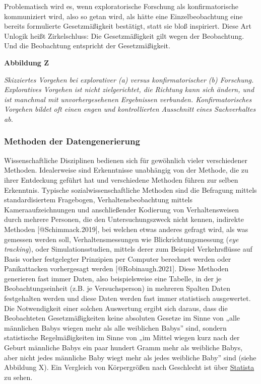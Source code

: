 \documentclass[
  letterpaper,
  DIV=11,
  numbers=noendperiod]{scrreprt}
\begin{document}
Problematisch wird es, wenn exploratorische Forschung als
konfirmatorische kommuniziert wird, also so getan wird, als hätte eine
Einzelbeobachtung eine bereits formulierte Gesetzmäßigkeit bestätigt,
statt sie bloß inspiriert. Diese Art Unlogik heißt Zirkelschluss: Die
Gesetzmäßigkeit gilt wegen der Beobachtung. Und die Beobachtung
entspricht der Gesetzmäßigkeit.

\textbf{Abbildung Z}

\emph{Skizziertes Vorgehen bei explorativer (a) versus konfirmatorischer
(b) Forschung. Exploratives Vorgehen ist nicht zielgerichtet, die
Richtung kann sich ändern, und ist manchmal mit unvorhergesehenen
Ergebnissen verbunden. Konfirmatorisches Vorgehen bildet oft einen engen
und kontrollierten Ausschnitt eines Sachverhaltes ab.}

\subsubsection{Methoden der
Datengenerierung}\label{methoden-der-datengenerierung}

Wissenschaftliche Disziplinen bedienen sich für gewöhnlich vieler
verschiedener Methoden. Idealerweise sind Erkenntnisse unabhängig von
der Methode, die zu ihrer Entdeckung geführt hat und verschiedene
Methoden führen zur selben Erkenntnis. Typische sozialwissenschaftliche
Methoden sind die Befragung mittels standardisiertem Fragebogen,
Verhaltensbeobachtung mittels Kameraaufzeichnungen und anschließender
Kodierung von Verhaltensweisen durch mehrere Personen, die den
Untersuchungszweck nicht kennen, indirekte Methoden
{[}@Schimmack.2019{]}, bei welchen etwas anderes gefragt wird, als was
gemessen werden soll, Verhaltensmessungen wie Blickrichtungsmessung
(\emph{eye tracking}), oder Simulationsstudien, mittels derer zum
Beispiel Verkehrsflüsse auf Basis vorher festgelegter Prinzipien per
Computer berechnet werden oder Panikattacken vorhergesagt werden
{[}@Robinaugh.2021{]}. Diese Methoden generieren fast immer Daten, also
beispielsweise eine Tabelle, in der je Beobachtungseinheit (z.B. je
Versuchsperson) in mehreren Spalten Daten festgehalten werden und diese
Daten werden fast immer statistisch ausgewertet. Die Notwendigkeit einer
solchen Auswertung ergibt sich daraus, dass die Beobachteten
Gesetzmäßigkeiten keine absoluten Gesetze im Sinne von „alle männlichen
Babys wiegen mehr als alle weiblichen Babys'' sind, sondern statistische
Regelmäßigkeiten im Sinne von „im Mittel wiegen kurz nach der Geburt
männliche Babys ein paar hundert Gramm mehr als weibliche Babys, aber
nicht jedes männliche Baby wiegt mehr als jedes weibliche Baby'' sind
(siehe Abbildung X). Ein Vergleich von Körpergrößen nach Geschlecht ist
über
\href{https://de.statista.com/statistik/daten/studie/1825/umfrage/koerpergroesse-nach-geschlecht/}{Statista}
zu sehen.
\end{document}
